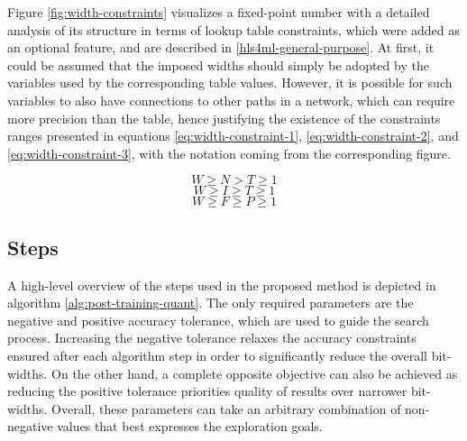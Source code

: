 Figure \ref{fig:width-constraints} visualizes a fixed-point number with a detailed analysis of its structure in terms of lookup table constraints, which were added as an optional feature, and are described in \cref{hls4ml-general-purpose}. At first, it could be assumed that the imposed widths should simply be adopted by the variables used by the corresponding table values. However, it is possible for such variables to also have connections to other paths in a network, which can require more precision than the table, hence justifying the existence of the constraints ranges presented in equations \ref{eq:width-constraint-1}, \ref{eq:width-constraint-2}, and \ref{eq:width-constraint-3}, with the notation coming from the corresponding figure.

\begin{equation} \label{eq:width-constraint-1}
  W \geqslant N > T \geqslant 1
\end{equation}
\begin{equation} \label{eq:width-constraint-2}
  W \geqslant I \geqslant T \geqslant 1
\end{equation}
\begin{equation} \label{eq:width-constraint-3}
  W \geqslant F \geqslant P \geqslant 1
\end{equation}

\subsection{Steps}
A high-level overview of the steps used in the proposed method is depicted in algorithm \ref{alg:post-training-quant}. The only required parameters are the negative and positive accuracy tolerance, which are used to guide the search process. Increasing the negative tolerance relaxes the accuracy constraints ensured after each algorithm step in order to significantly reduce the overall bit-widths. On the other hand, a complete opposite objective can also be achieved as reducing the positive tolerance priorities quality of results over narrower bit-widths. Overall, these parameters can take an arbitrary combination of non-negative values that best expresses the exploration goals.

